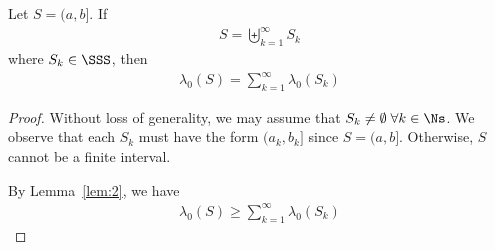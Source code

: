 \documentclass[thmcnt=section, 12pt]{elegantbook}
\begin{document}
\begin{lemma} \label{lem:3}
    Let $S = (a, b]$. If 
    \begin{align*}
        S = \biguplus_{k=1}^\infty S_k
    \end{align*}
    where $S_k \in \SSS$, then 
    \begin{align}
        \lambda_0(S) = \sum_{k=1}^\infty \lambda_0(S_k) 
        \label{eq:7}
    \end{align}
\end{lemma}

\begin{proof}
    Without loss of generality, we may assume that $S_k \neq \emptyset \; \forall k \in \Ns$. We observe that each $S_k$ must have the form $(a_k, b_k]$ since $S = (a, b]$. Otherwise, $S$ cannot be a finite interval.

    \par By Lemma~\ref{lem:2}, we have 
    \begin{align}
        \lambda_0(S) \geq \sum_{k=1}^\infty \lambda_0(S_k) 
        \label{eq:13}
    \end{align}


\end{proof}
\end{document}
